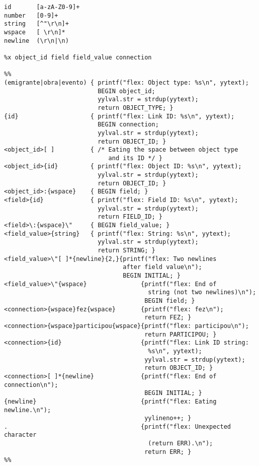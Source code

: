 \documentclass[a4paper]{article}
\begin{document}
\begin{lstlisting}
id       [a-zA-Z0-9]+
number   [0-9]+
string   [^"\r\n]+
wspace   [ \r\n]*
newline  (\r\n|\n)

%x object_id field field_value connection

%%
(emigrante|obra|evento) { printf("flex: Object type: %s\n", yytext);
                          BEGIN object_id; 
                          yylval.str = strdup(yytext); 
                          return OBJECT_TYPE; }
{id}                    { printf("flex: Link ID: %s\n", yytext);
                          BEGIN connection; 
                          yylval.str = strdup(yytext); 
                          return OBJECT_ID; }
<object_id>[ ]          { /* Eating the space between object type 
                             and its ID */ }
<object_id>{id}         { printf("flex: Object ID: %s\n", yytext);
                          yylval.str = strdup(yytext); 
                          return OBJECT_ID; }
<object_id>:{wspace}    { BEGIN field; }
<field>{id}             { printf("flex: Field ID: %s\n", yytext);
                          yylval.str = strdup(yytext); 
                          return FIELD_ID; }
<field>\:{wspace}\"     { BEGIN field_value; }
<field_value>{string}   { printf("flex: String: %s\n", yytext);
                          yylval.str = strdup(yytext); 
                          return STRING; }
<field_value>\"[ ]*{newline}{2,}{printf("flex: Two newlines 
                                 after field value\n");
                                 BEGIN INITIAL; }
<field_value>\"{wspace}               {printf("flex: End of 
                                        string (not two newlines)\n");    
                                       BEGIN field; }
<connection>{wspace}fez{wspace}       {printf("flex: fez\n");                                 
                                       return FEZ; }
<connection>{wspace}participou{wspace}{printf("flex: participou\n");                          
                                       return PARTICIPOU; }
<connection>{id}                      {printf("flex: Link ID string:
                                        %s\n", yytext);          
                                       yylval.str = strdup(yytext); 
                                       return OBJECT_ID; }
<connection>[ ]*{newline}             {printf("flex: End of connection\n");                   
                                       BEGIN INITIAL; }
{newline}                             {printf("flex: Eating newline.\n");                     
                                       yylineno++; }
.                                     {printf("flex: Unexpected character 
                                        (return ERR).\n");  
                                       return ERR; }
%%

\end{lstlisting}
\end{document}
